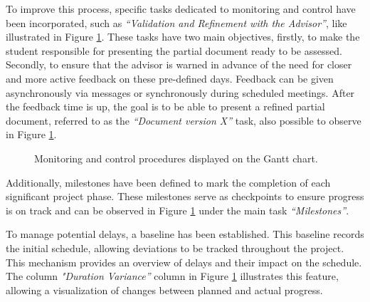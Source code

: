 To improve this process, specific tasks dedicated to monitoring and control have been incorporated, such as \textit{“Validation and Refinement with the Advisor”}, like illustrated in Figure \ref{fig:gantt_monitoring}. These tasks have two main objectives, firstly, to make the student responsible for presenting the partial document ready to be assessed. Secondly, to ensure that the advisor is warned in advance of the need for closer and more active feedback on these pre-defined days. Feedback can be given asynchronously via messages or synchronously during scheduled meetings. After the feedback time is up, the goal is to be able to present a refined partial document, referred to as the \textit{“Document version X”} task, also possible to observe in Figure \ref{fig:gantt_monitoring}.

\begin{figure}
      \centering
      \caption{Monitoring and control procedures displayed on the Gantt chart.}
      \label{fig:gantt_monitoring}
\end{figure}

Additionally, milestones have been defined to mark the completion of each significant project phase. These milestones serve as checkpoints to ensure progress is on track and can be observed in Figure \ref{fig:gantt_monitoring} under the main task \textit{“Milestones”}.

To manage potential delays, a baseline has been established. This baseline records the initial schedule, allowing deviations to be tracked throughout the project. This mechanism provides an overview of delays and their impact on the schedule. The column \textit{"Duration Variance”} column in Figure \ref{fig:gantt_monitoring} illustrates this feature, allowing a visualization of changes between planned and actual progress.

